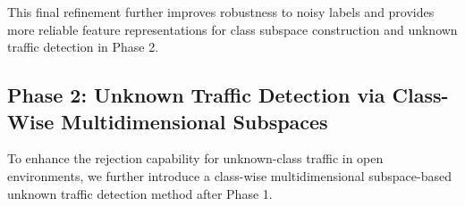 \documentclass{SCIS2026}
\begin{document}
This final refinement further improves robustness to noisy labels and provides more reliable feature representations for class subspace construction and unknown traffic detection in Phase 2. 




%		
%		
%		
%		
%		



\subsection{Phase 2: Unknown Traffic Detection via Class-Wise Multidimensional Subspaces}

To enhance the rejection capability for unknown-class traffic in open environments, we further introduce a class-wise multidimensional subspace-based unknown traffic detection method after Phase 1. 

\end{document}
